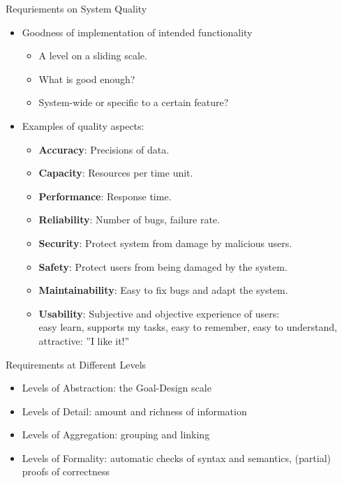 \documentclass{beamer}
\begin{document}
\begin{frame}[fragile]{Requriements on System Quality}
\begin{itemize}
\item Goodness of implementation of intended functionality 
\begin{itemize}
  \item A level on a sliding scale.
  \item What is good enough?
  \item System-wide or specific to a certain feature?
\end{itemize}
\item Examples of quality aspects:
\begin{itemize}
\item \textbf{Accuracy}: Precisions of data.
\item \textbf{Capacity}: Resources per time unit.
\item \textbf{Performance}: Response time.
\item \textbf{Reliability}: Number of bugs, failure rate.
\item \textbf{Security}: Protect system from damage by malicious users. 
\item \textbf{Safety}: Protect users from being damaged by the system.
\item \textbf{Maintainability}: Easy to fix bugs and adapt the system.
\item \textbf{Usability}: Subjective and objective experience of users:\\ easy learn, supports my tasks, easy to remember, easy to understand, attractive: ''I like it!'' 
\end{itemize}
\end{itemize}
\end{frame}

\begin{frame}[fragile]{Requirements at Different Levels}
\begin{itemize}
\item Levels of Abstraction: the Goal-Design scale 
\item Levels of Detail: amount and richness of information 
\item Levels of Aggregation: grouping and linking 
\item Levels of Formality: automatic checks of syntax and semantics, (partial) proofs of correctness
\end{itemize}
\end{frame}
\end{document}
